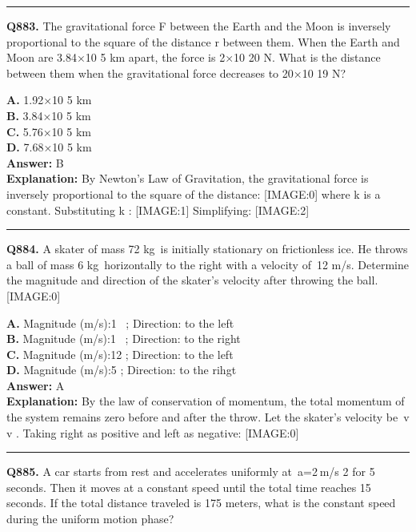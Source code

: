 \documentclass[12pt]{article}
\begin{document}
\hrule
\vspace{1em}


\noindent
\textbf{Q883.} The gravitational force F between the Earth and the Moon is inversely proportional to the square of the distance r between them. When the Earth and Moon are 3.84×10
5
km apart, the force is 2×10
20
N. What is the distance between them when the gravitational force decreases to 20×10
19
N?



\textbf{A.} 1.92×10
5
km \\
\textbf{B.} 3.84×10
5
km \\
\textbf{C.} 5.76×10
5
km \\
\textbf{D.} 7.68×10
5
km \\

\textbf{Answer:} B \\
\textbf{Explanation:} By Newton's Law of Gravitation, the gravitational force is inversely proportional to the square of the distance:
[IMAGE:0]
where k is a constant.
Substituting
k
:
[IMAGE:1]
Simplifying:
[IMAGE:2]

\hrule
\vspace{1em}


\noindent
\textbf{Q884.} A skater of mass
72
kg is initially stationary on frictionless ice. He throws a ball of mass
6
kg horizontally to the right with a velocity of 12
m/s. Determine the magnitude and direction of the skater’s velocity after throwing the ball.
[IMAGE:0]



\textbf{A.} Magnitude (m/s):1  ;
Direction:
to the left \\
\textbf{B.} Magnitude (m/s):1  ;
Direction:
to the right \\
\textbf{C.} Magnitude (m/s):12 ;
Direction:
to the left \\
\textbf{D.} Magnitude (m/s):5 ;
Direction:
to the rihgt \\

\textbf{Answer:} A \\
\textbf{Explanation:} By the law of conservation of momentum, the total momentum of the system remains zero before and after the throw.
Let the skater’s velocity be v
v
. Taking right as positive and left as negative:
[IMAGE:0]

\hrule
\vspace{1em}


\noindent
\textbf{Q885.} A car starts from rest and accelerates uniformly at a=2 m/s
2
for 5 seconds. Then it moves at a constant speed until the total time reaches 15 seconds. If the total distance traveled is 175 meters, what is the constant speed during the uniform motion phase?
\end{document}
